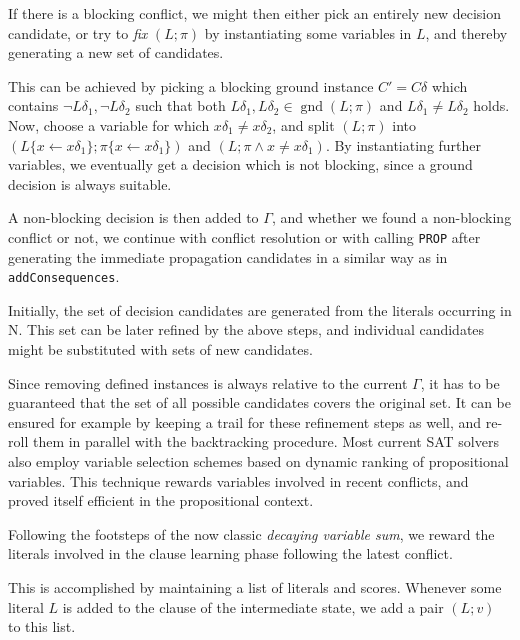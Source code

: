\documentclass[a4paper]{article}
\newcommand{\mGnd}{\operatorname{gnd}} \newcommand{\mLVar}{\operatorname{lvar}} \newcommand{\mRVar}{\operatorname{rvar}} \newcommand{\mDmn}{\operatorname{dom}} \newcommand{\mRng}{\operatorname{rng}} \newcommand{\mMGU}{\operatorname{mgu}} \newcommand{\mDef}{\operatorname{def}} \newcommand{\mDomain}{\mathcal{D}} \newcommand{\mVar}{\operatorname{var}}
\begin{document}
If there is a blocking conflict, 
we might then either pick an entirely new decision candidate, or try to \emph{fix} $(L;\pi)$ by instantiating some variables in $L$, and thereby generating a new set of candidates.  

This can be achieved by picking a blocking ground instance $C' = C\delta$ which contains $\neg L\delta_1, \neg L\delta_2$ such that
both $L\delta_1, L\delta_2 \in \mGnd(L; \pi)$ and $L\delta_1 \ne L\delta_2$ holds. 
Now, choose a variable for which $x\delta_1 \ne x\delta_2$, and
split $(L; \pi)$ into $(L\{x \gets x\delta_1\}; \pi\{x \gets x\delta_1\})$ and $(L; \pi \land x \ne x\delta_1)$.
By instantiating further variables, we eventually get a decision which is not blocking, since a ground decision is always suitable.

A non-blocking decision is then added to $\Gamma$, and whether we found a non-blocking conflict or not, we continue with conflict 
resolution or with calling \texttt{PROP} after generating the immediate propagation candidates in a similar way as in \texttt{addConsequences}.

Initially, the set of decision candidates are generated from the literals occurring in $\text{N}$. 
This set can be later refined by the above steps, and individual candidates might be substituted with sets of new candidates.

Since removing defined instances is always relative to the current $\Gamma$, it has to be guaranteed that the set of all possible candidates
covers the original set.
It can be ensured for example by keeping a trail for these refinement steps as well, and re-roll them in parallel with the backtracking procedure.
Most current SAT solvers also employ variable selection schemes based on dynamic ranking of propositional variables. 
This technique rewards variables involved in recent conflicts, and proved itself efficient in the propositional context. 

Following the footsteps of the now classic \emph{decaying variable sum}, we reward the literals 
involved in the clause learning phase following the latest conflict. 

This is accomplished by maintaining a list of literals and scores. 
Whenever some literal $L$ is added to the clause of the intermediate state, we add a pair $(L; v)$ to this list.
\end{document}

